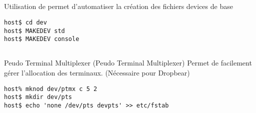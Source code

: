 \subsection{}

\begin{frame}[fragile=singleslide]{Utilisation de }
   permet d'automatiser  la création des fichiers devices
  de base
  \begin{lstlisting}
host$ cd dev
host$ MAKEDEV std
host$ MAKEDEV console
  \end{lstlisting}
\end{frame}

\subsection{}

\begin{frame}[fragile=singleslide]{Peudo Terminal Multiplexer}
   (Peudo  Terminal Multiplexer) Permet  de facilement gérer
  l'allocation des terminaux. (Nécessaire pour Dropbear)
  \begin{lstlisting}
host% mknod dev/ptmx c 5 2
host$ mkdir dev/pts
host$ echo 'none /dev/pts devpts' >> etc/fstab
  \end{lstlisting}
\end{frame}

\subsection{}


